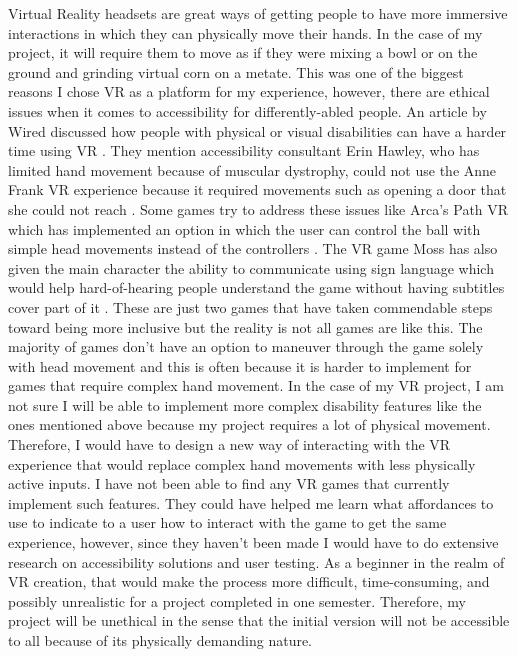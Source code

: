 \documentclass[11pt,twocolumn]{article}
\begin{document}
Virtual Reality headsets are great ways of getting people to have more immersive interactions in which they can physically move their hands. In the case of my project, it will require them to move as if they were mixing a bowl or on the ground and grinding virtual corn on a metate. This was one of the biggest reasons I chose VR as a platform for my experience, however, there are ethical issues when it comes to accessibility for differently-abled people. An article by Wired discussed how people with physical or visual disabilities can have a harder time using VR \cite{vraccessibility2022}. They mention accessibility consultant Erin Hawley, who has limited hand movement because of muscular dystrophy, could not use the Anne Frank VR experience because it required movements such as opening a door that she could not reach \cite{vraccessibility2022}. Some games try to address these issues like Arca’s Path VR which has implemented an option in which the user can control the ball with simple head movements instead of the controllers \cite{arcaspath2018}. The VR game Moss has also given the main character the ability to communicate using sign language which would help hard-of-hearing people understand the game without having subtitles cover part of it \cite{moss2019}. These are just two games that have taken commendable steps toward being more inclusive but the reality is not all games are like this. The majority of games don’t have an option to maneuver through the game solely with head movement and this is often because it is harder to implement for games that require complex hand movement. In the case of my VR project, I am not sure I will be able to implement more complex disability features like the ones mentioned above because my project requires a lot of physical movement. Therefore, I would have to design a new way of interacting with the VR experience that would replace complex hand movements with less physically active inputs. I have not been able to find any VR games that currently implement such features. They could have helped me learn what affordances to use to indicate to a user how to interact with the game to get the same experience, however, since they haven’t been made I would have to do extensive research on accessibility solutions and user testing. As a beginner in the realm of VR creation, that would make the process more difficult, time-consuming, and possibly unrealistic for a project completed in one semester. Therefore, my project will be unethical in the sense that the initial version will not be accessible to all because of its physically demanding nature.
\end{document}
